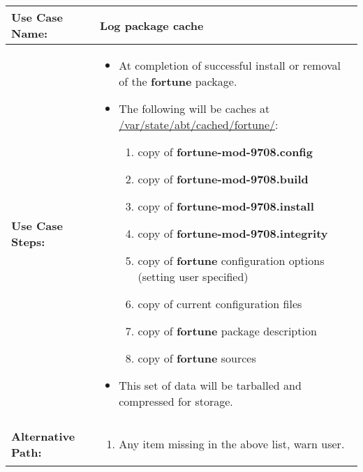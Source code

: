 \medskip

\begin{tabularx}{\linewidth}{|l|X|}
\hline
\textbf{Use Case Name:} & \textbf{Log package cache} \\
\hline
\textbf{Use Case Steps:} & 
\begin{minipage}{\linewidth} 
  \vspace{0.05em}
  \begin{itemize}
    \item At completion of successful install or removal of the \textbf{fortune} package.
    \item The following will be caches at \url{/var/state/abt/cached/fortune/}:
    \begin{enumerate}
      \item copy of \textbf{fortune-mod-9708.config}
      \item copy of \textbf{fortune-mod-9708.build}
      \item copy of \textbf{fortune-mod-9708.install}
      \item copy of \textbf{fortune-mod-9708.integrity}
      \item copy of \textbf{fortune} configuration options (setting user specified)
      \item copy of current configuration files
      \item copy of \textbf{fortune} package description
      \item copy of \textbf{fortune} sources
    \end{enumerate}
    \item This set of data will be tarballed and compressed for storage.
  \end{itemize}
  \vspace{0.05em}
\end{minipage}
\\
\hline 
\textbf{Alternative Path:} &
\begin{minipage}{\linewidth}
  \vspace{0.05em} 
  \begin{enumerate}
    \item Any item missing in the above list, warn user.
  \end{enumerate}
  \vspace{0.05em} 
\end{minipage}
\\
\hline
\end{tabularx}